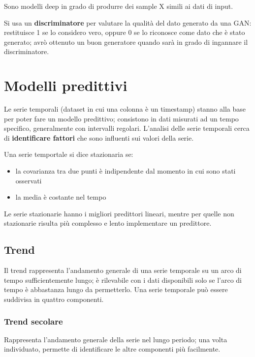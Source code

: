 \documentclass{report}
\begin{document}
Sono modelli deep in grado di produrre dei sample X simili ai dati di input. 

\noindent Si usa un \textbf{discriminatore} per valutare la qualità del dato generato da una GAN: restituisce 1 se lo considero vero, oppure 
0 se lo riconosce come dato che è stato generato; avrò ottenuto un buon generatore quando sarà in grado di ingannare il discriminatore.



\section{Modelli predittivi}

Le serie temporali (dataset in cui una colonna è un timestamp) stanno alla base per poter fare un modello predittivo; consistono in dati 
misurati ad un tempo specifico, generalmente con intervalli regolari. L'analisi delle serie temporali cerca di \textbf{identificare fattori}
che sono influenti sui valori della serie.

\noindent Una serie temportale si dice stazionaria se:
\begin{itemize}
    \item la covarianza tra due punti è indipendente dal momento in cui sono stati osservati 
    \item la media è costante nel tempo 
\end{itemize}

\noindent Le serie stazionarie hanno i migliori predittori lineari, mentre per quelle non stazionarie risulta più complesso e lento implementare 
un predittore.

\subsection{Trend}

Il trend rappresenta l'andamento generale di una serie temporale su un arco di tempo sufficientemente lungo; è rilevabile con i dati disponibili 
solo se l'arco di tempo è abbastanza lungo da permetterlo. Una serie temporale può essere suddivisa in quattro componenti.

\subsubsection{Trend secolare}
Rappresenta l'andamento generale della serie nel lungo periodo; una volta individuato, permette di identificare le altre componenti più facilmente.
\end{document}
